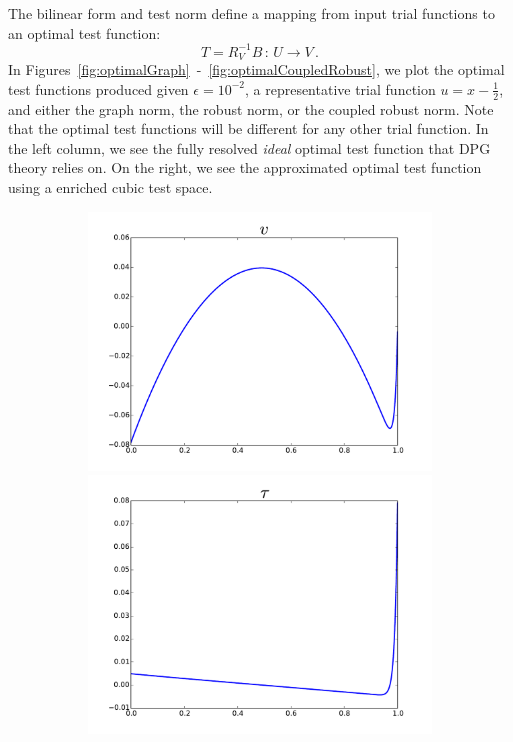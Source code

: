 \documentclass[Dissertation.tex]{subfiles}
\begin{document}
The bilinear form and test norm define a mapping from input trial functions to an optimal test function:
\[
T=R_V^{-1}B\,:\,U\rightarrow V\,.
\]
In Figures~\ref{fig:optimalGraph}~-~\ref{fig:optimalCoupledRobust}, 
we plot the optimal test functions produced given $\epsilon=10^{-2}$, a representative trial function $u=x-\frac{1}{2}$,
and either the graph norm, the robust norm, or the coupled robust norm.
Note that the optimal test functions will be different for any other trial function.
In the left column, we see the fully resolved \emph{ideal} optimal test function that DPG theory relies on.
On the right, we see the approximated optimal test function using a enriched cubic test space.
\begin{figure}[ht]
\centering
\begin{subfigure}[t]{0.45\textwidth}
\centering
\includegraphics[width=\textwidth]{OptimalTestFunctions/uLinear_1e-2/steady/graph_steady_v}\\
\includegraphics[width=\textwidth]{OptimalTestFunctions/uLinear_1e-2/steady/graph_steady_tau}\\

\end{subfigure}
\end{figure}
\end{document}
